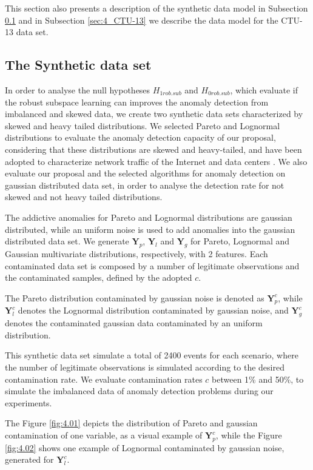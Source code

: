 This section also presents a description of the synthetic data model in Subsection \ref{sec:4_synthetic} and in Subsection \ref{sec:4_CTU-13} we describe the data model for the CTU-13 data set.

\subsection{The Synthetic data set}
\label{sec:4_synthetic}

In order to analyse the null hypotheses $H_{1rob.sub}$ and $H_{0rob.sub}$, which evaluate if the robust subspace learning can improves the anomaly detection from imbalanced and skewed data, we create two synthetic data sets characterized by skewed and heavy tailed distributions. We selected Pareto and Lognormal distributions to evaluate the anomaly detection capacity of our proposal, considering that these distributions are skewed and heavy-tailed, and have been adopted to characterize network traffic of the Internet and data centers \cite{benson2010network,leon2017probability}. We also evaluate our proposal and the selected algorithms for anomaly detection on gaussian distributed data set, in order to analyse the detection rate for not skewed and not heavy tailed distributions.

The addictive anomalies for Pareto and Lognormal distributions are gaussian distributed, while an uniform noise is used to add anomalies into the gaussian distributed data set. We generate $\boldsymbol{Y}_p$, $\boldsymbol{Y}_l$ and $\boldsymbol{Y}_g$ for Pareto, Lognormal and Gaussian multivariate distributions, respectively, with 2 features. Each contaminated data set is composed by a number of legitimate observations and the contaminated samples, defined by the adopted $c$.

The Pareto distribution contaminated by gaussian noise is denoted as $\boldsymbol{Y}_p^c$, while $\boldsymbol{Y}_l^c$ denotes the Lognormal distribution contaminated by gaussian noise, and $\boldsymbol{Y}_g^c$ denotes the contaminated gaussian data contaminated by an uniform distribution.

This synthetic data set simulate a total of 2400 events for each scenario, where the number of legitimate observations is simulated according to the desired contamination rate. We evaluate contamination rates $c$ between 1\% and 50\%, to simulate the imbalanced data of anomaly detection problems during our experiments.

The Figure \ref{fig:4.01} depicts the distribution of Pareto and gaussian contamination of one variable, as a visual example of $\boldsymbol{Y}_p^c$, while the Figure \ref{fig:4.02} shows one example of Lognormal contaminated by gaussian noise, generated for $\boldsymbol{Y}_l^c$.

